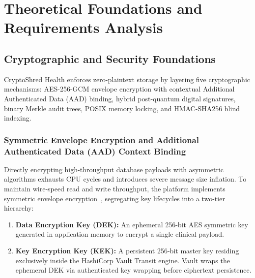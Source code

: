 
\chapter{Theoretical Foundations and Requirements Analysis}\label{section:foundations}


\section{Cryptographic and Security Foundations}\label{section:crypto-foundations}

CryptoShred Health enforces zero-plaintext storage by layering five cryptographic mechanisms: AES-256-GCM envelope encryption with contextual Additional Authenticated Data (AAD) binding, hybrid post-quantum digital signatures, binary Merkle audit trees, POSIX memory locking, and HMAC-SHA256 blind indexing.

\subsection{Symmetric Envelope Encryption and Additional Authenticated Data (AAD) Context Binding}

Directly encrypting high-throughput database payloads with asymmetric algorithms exhausts CPU cycles and introduces severe message size inflation. To maintain wire-speed read and write throughput, the platform implements symmetric envelope encryption~\cite{boneh_shoup_2020}, segregating key lifecycles into a two-tier hierarchy:
\begin{enumerate}
    \item \textbf{Data Encryption Key (DEK):} An ephemeral 256-bit AES symmetric key generated in application memory to encrypt a single clinical payload.
    \item \textbf{Key Encryption Key (KEK):} A persistent 256-bit master key residing exclusively inside the HashiCorp Vault Transit engine. Vault wraps the ephemeral DEK via authenticated key wrapping before ciphertext persistence.
\end{enumerate}

